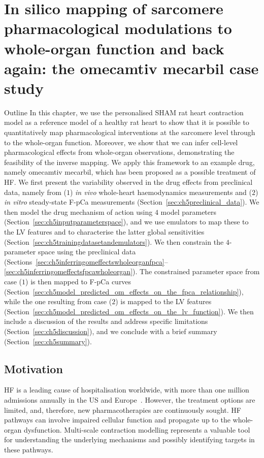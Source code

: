 \chapter{In silico mapping of sarcomere pharmacological modulations to whole-organ function and back again: the omecamtiv mecarbil case study}\label{cha:chapter5}
%
%
%
\begin{remark}{Outline}
    In this chapter, we use the personalised SHAM rat heart contraction model as a reference model of a healthy rat heart to show that it is possible to quantitatively map pharmacological interventions at the sarcomere level through to the whole-organ function. Moreover, we show that we can infer cell-level pharmacological effects from whole-organ observations, demonstrating the feasibility of the inverse mapping. We apply this framework to an example drug, namely omecamtiv mecarbil, which has been proposed as a possible treatment of HF.
    We first present the variability observed in the drug effects from preclinical data, namely from ($1$) \textit{in vivo} whole-heart haemodynamics measurements and ($2$) \textit{in vitro} steady-state F-pCa measurements (Section~\ref{sec:ch5preclinical_data}). We then model the drug mechanism of action using $4$ model parameters (Section~\ref{sec:ch5inputparameterspace}), and we use emulators to map these to the LV features and to characterise the latter global sensitivities (Section~\ref{sec:ch5trainingdatasetandemulators}). We then constrain the $4$-parameter space using the preclinical data (Sections~\ref{sec:ch5inferringomeffectswholeorganfpca}--\ref{sec:ch5inferringomeffectsfpcawholeorgan}). The constrained parameter space from case ($1$) is then mapped to F-pCa curves (Section~\ref{sec:ch5model_predicted_om_effects_on_the_fpca_relationship}), while the one resulting from case ($2$) is mapped to the LV features (Section~\ref{sec:ch5model_predicted_om_effects_on_the_lv_function}). We then include a discussion of the results and address specific limitations (Section~\ref{sec:ch5discussion}), and we conclude with a brief summary (Section~\ref{sec:ch5summary}).
\end{remark}


%
%
%
\section{Motivation}\label{sec:ch5motivation}
HF is a leading cause of hospitalisation worldwide, with more than one million admissions annually in the US and Europe~\cite{Benjamin:2018}. However, the treatment options are limited, and, therefore, new pharmacotherapies are continuously sought. HF pathways can involve impaired cellular function and propagate up to the whole-organ dysfunction. Multi-scale contraction modelling represents a valuable tool for understanding the underlying mechanisms and possibly identifying targets in these pathways.

